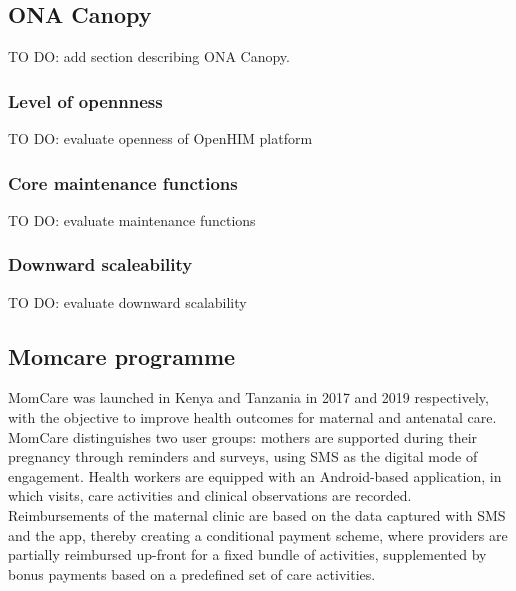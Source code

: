 \documentclass[
  authoryear]{elsarticle}
\begin{document}
\subsection{ONA Canopy}\label{ona-canopy}

TO DO: add section describing ONA Canopy.

\subsubsection{Level of opennness}\label{level-of-opennness-1}

TO DO: evaluate openness of OpenHIM platform

\subsubsection{Core maintenance
functions}\label{core-maintenance-functions-1}

TO DO: evaluate maintenance functions

\subsubsection{Downward scaleability}\label{downward-scaleability-1}

TO DO: evaluate downward scalability

\subsection{Momcare programme}\label{momcare-programme}

MomCare was launched in Kenya
\citep{huisman2022digital, sanctis2022maintaining} and Tanzania
\citep{shija2021access, mrema2021application} in 2017 and 2019
respectively, with the objective to improve health outcomes for maternal
and antenatal care. MomCare distinguishes two user groups: mothers are
supported during their pregnancy through reminders and surveys, using
SMS as the digital mode of engagement. Health workers are equipped with
an Android-based application, in which visits, care activities and
clinical observations are recorded. Reimbursements of the maternal
clinic are based on the data captured with SMS and the app, thereby
creating a conditional payment scheme, where providers are partially
reimbursed up-front for a fixed bundle of activities, supplemented by
bonus payments based on a predefined set of care activities.
\end{document}
